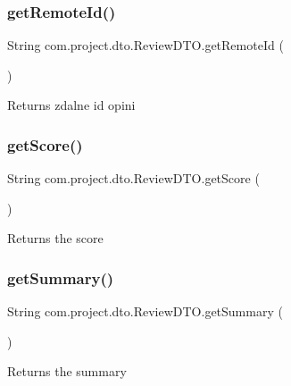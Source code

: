 \subsubsection{get\+Remote\+Id()}
{\footnotesize\ttfamily String com.\+project.\+dto.\+Review\+D\+T\+O.\+get\+Remote\+Id (\begin{DoxyParamCaption}{ }\end{DoxyParamCaption})}

\begin{DoxyReturn}{Returns}
zdalne id opini 
\end{DoxyReturn}
\mbox{\label{classcom_1_1project_1_1dto_1_1_review_d_t_o_ab6709430c27a797db7957fc5b0d1740c}} 
\subsubsection{get\+Score()}
{\footnotesize\ttfamily String com.\+project.\+dto.\+Review\+D\+T\+O.\+get\+Score (\begin{DoxyParamCaption}{ }\end{DoxyParamCaption})}

\begin{DoxyReturn}{Returns}
the score 
\end{DoxyReturn}
\mbox{\label{classcom_1_1project_1_1dto_1_1_review_d_t_o_a4a30ca059359854f5f2dab97a6be1bdd}} 
\subsubsection{get\+Summary()}
{\footnotesize\ttfamily String com.\+project.\+dto.\+Review\+D\+T\+O.\+get\+Summary (\begin{DoxyParamCaption}{ }\end{DoxyParamCaption})}

\begin{DoxyReturn}{Returns}
the summary 
\end{DoxyReturn}
\mbox{\label{classcom_1_1project_1_1dto_1_1_review_d_t_o_a0d7851af9a42d2d40c40b2dea2c9ff20}} 
